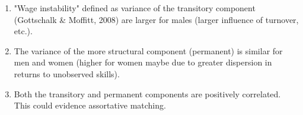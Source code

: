 \documentclass[notes=show]{beamer}
\begin{document}
\begin{frame}%


\begin{center}
\end{center}

\transboxout%
\end{frame}%

\bigskip

\begin{frame}%


\begin{enumerate}
\item "Wage instability" defined as variance of the transitory component
(Gottschalk \& Moffitt, 2008) are larger for males (larger influence of
turnover, etc.).

\item The variance of the more structural component (permanent) is similar
for men and women (higher for women maybe due to greater dispersion in
returns to unobserved skills).

\item Both the transitory and permanent components are positively
correlated. This could evidence assortative matching.
\end{enumerate}

\transboxout%
\end{frame}%
\end{document}
